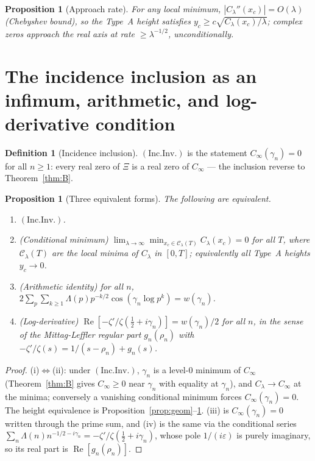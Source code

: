 \documentclass[11pt]{amsart}
\newtheorem{proposition}[theorem]{Proposition}
\theoremstyle{definition}
\newtheorem{definition}[theorem]{Definition}
\theoremstyle{remark}
\renewcommand{\Re}{\operatorname{Re}}
\newcommand{\half}{\tfrac12}
\newcommand{\Cinf}{C_\infty}
\newcommand{\Clam}{C_\lambda}
\newcommand{\gamn}{\gamma_n}
\newcommand{\rhon}{\rho_n}
\newcommand{\incInv}{(\mathrm{Inc.Inv.})}
\begin{document}
\begin{proposition}[Approach rate]\label{prop:approach}
For any local minimum, $|\Clam''(x_c)|=O(\lambda)$ (Chebyshev bound), so the Type~A height
satisfies $y_c\ge c\sqrt{\Clam(x_c)/\lambda}$; complex zeros approach the real axis at rate
$\ge\lambda^{-1/2}$, unconditionally.
\end{proposition}

\section{The incidence inclusion as an infimum, arithmetic, and log-derivative condition}
\label{sec:inf}

\begin{definition}[Incidence inclusion]\label{def:ii}
$\incInv$ is the statement $\Cinf(\gamn)=0$ for all $n\ge1$: every real zero of $\Xi$ is a real
zero of $\Cinf$ --- the inclusion reverse to Theorem~\ref{thm:B}.
\end{definition}

\begin{proposition}[Three equivalent forms]\label{prop:three}
The following are equivalent.
\begin{enumerate}
\item[\rm(i)] $\incInv$.
\item[\rm(ii)] \emph{(Conditional minimum)} $\lim_{\lambda\to\infty}\min_{x_c\in\mathcal
C_\lambda(T)}\Clam(x_c)=0$ for all $T$, where $\mathcal C_\lambda(T)$ are the local minima of
$\Clam$ in $[0,T]$; equivalently all Type~A heights $y_c\to0$.
\item[\rm(iii)] \emph{(Arithmetic identity)} for all $n$,
$2\sum_p\sum_{k\ge1}\Lambda(p)p^{-k/2}\cos(\gamn\log p^k)=w(\gamn)$.
\item[\rm(iv)] \emph{(Log-derivative)} $\Re[-\zeta'/\zeta(\half+i\gamn)]=w(\gamn)/2$ for all
$n$, in the sense of the Mittag-Leffler regular part $g_n(\rhon)$ with $-\zeta'/\zeta(s)=
1/(s-\rhon)+g_n(s)$.
\end{enumerate}
\end{proposition}
\begin{proof}
(i)$\Leftrightarrow$(ii): under $\incInv$, $\gamn$ is a level-$0$ minimum of $\Cinf$
(Theorem~\ref{thm:B} gives $\Cinf\ge0$ near $\gamn$ with equality at $\gamn$), and $\Clam\to
\Cinf$ at the minima; conversely a vanishing conditional minimum forces $\Cinf(\gamn)=0$. The
height equivalence is Proposition~\ref{prop:geom}--\ref{prop:approach}. (iii) is $\Cinf(\gamn)
=0$ written through the prime sum, and (iv) is the same via the conditional series
$\sum_n\Lambda(n)n^{-1/2-i\gamn}=-\zeta'/\zeta(\half+i\gamn)$, whose pole $1/(i\varepsilon)$ is
purely imaginary, so its real part is $\Re[g_n(\rhon)]$.
\end{proof}
\end{document}
